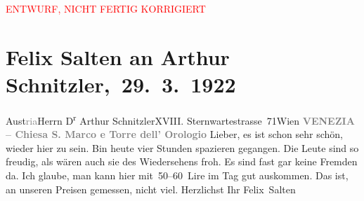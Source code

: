 
\begin{center}
            \textcolor{red}{ENTWURF, NICHT FERTIG KORRIGIERT}
                      \end{center}
            
         
         \renewcommand{\erwaehntePersonen}{Personen: Frieda Pollak}
         \renewcommand{\erwaehnteOrte}{Orte: San Marco, Stazione di Venezia Santa Lucia, Sternwartestraße 71, Torre dell’Orologio, Venedig, Wien, Österreich}
         \renewcommand{\erwaehnteWerke}{}
               \section[ Felix Salten an Arthur Schnitzler, 29. 3. 1922]{ Felix Salten an Arthur Schnitzler, 29. 3. 1922}\nopagebreak{}\rehead{ }\begin{ledgroupsized}[t]{13cm}\normalsize\beginnumbering \toendnotes[C]{\smallbreak\pagebreak[2]} 
\toendnotes[C]{\smallbreak}\pstart{}{\pb}Aust\textcolor{gray}{ria}\pend{}\pstart{}Herrn D\textsuperscript{r} Arthur Schnitzler\pend{}\pstart{}XVIII. Sternwartestrasse 71\pend{}\pstart{}Wien\pend{}{\bigskip}\pstart
           \noindent{}\centering{}{\pb}\textcolor{gray}{\textbf{VENEZIA – Chiesa S. Marco e Torre dell’ Orologio}}\pend
           \pstart
           \noindent{}{\pb}Lieber, es ist schon sehr schön, wieder hier zu sein. Bin heute vier Stunden spazieren gegangen. Die Leute sind so freudig, als
               wären auch sie des Wiedersehens froh. Es sind fast gar keine Fremden da. Ich glaube,
               man kann hier mit 50–60 Lire im Tag gut auskommen. Das ist, an unseren Preisen
               gemessen, nicht viel.\pend
           \pstart Herzlichst Ihr \spacefill\mbox{Felix Salten}\pend{}
         
         \endnumbering{}\end{ledgroupsized}  \newcommand{\dateiname}{L03576}\newcommand{\titel}{Felix Salten an Arthur Schnitzler, 29. 3. 1922}\newcommand{\editorInnen}{Martin Anton Müller und Laura Untner}
      